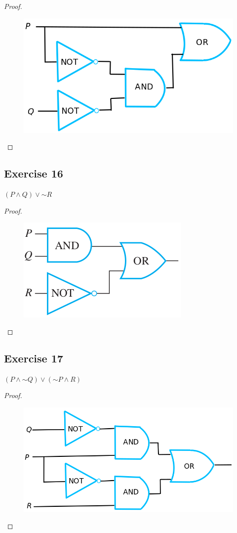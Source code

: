 \documentclass[14pt]{extarticle}
\begin{document}
\begin{proof}
\begin{figure}[ht!]
\centering
\includegraphics[scale=0.3]{../images/2.4.15.png}
\end{figure}
\end{proof}

\subsection{Exercise 16}
$(P \wedge Q) \vee {\sim R}$

\begin{proof}
\begin{figure}[ht!]
\centering
\includegraphics[scale=0.5]{../images/2.4.16.png}
\end{figure}
\end{proof}

\subsection{Exercise 17}
$(P \wedge {\sim Q}) \vee ({\sim P} \wedge R)$

\begin{proof}
\begin{figure}[ht!]
\centering
\includegraphics[scale=0.3]{../images/2.4.17.png}
\end{figure}
\end{proof}
\end{document}
